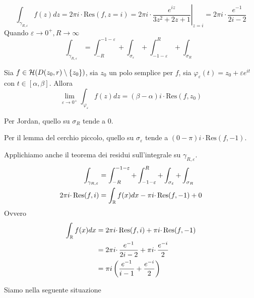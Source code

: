 \begin{equation*}
\int _{\gamma _{R,\varepsilon }} f(z)dz=2\pi i\cdot \mathrm{Res} (f,z=i)=2\pi i\cdotp \left. \frac{e^{iz}}{3z^{2} +2z+1}\right| _{z=i} =2\pi i\cdotp \frac{e^{-1}}{2i-2}
\end{equation*}
Quando $\varepsilon \rightarrow 0^{+} ,R\rightarrow \infty $
\begin{equation*}
\int _{\gamma _{R,\varepsilon }} =\int ^{-1-\varepsilon }_{-R} +\int _{\sigma _{\varepsilon }} +\int ^{R}_{-1-\varepsilon } +\int _{\sigma _{R}}
\end{equation*}
\begin{thm}
 Sia $f\in \mathcal{H} ( D( z_{0} ,r) \setminus \{z_{0}\})$, sia $z_{0}$ un polo semplice per $f$, sia $\varphi _{\varepsilon }( t) =z_{0} +\varepsilon e^{it}$ con $t\in [ \alpha ,\beta ]$. Allora
\begin{equation*}
\lim _{\varepsilon \rightarrow 0^{+}}\int _{\varphi _{\varepsilon }} f( z) dz=( \beta -\alpha ) i\cdotp \mathrm{Res}( f,z_{0})
\end{equation*}
\end{thm}
Per Jordan, quello su $\sigma _{R}$ tende a $0$.

Per il lemma del cerchio piccolo, quello su $\sigma _{\varepsilon }$ tende a $( 0-\pi ) i\cdotp \mathrm{Res}( f,-1)$.

Applichiamo anche il teorema dei residui sull'integrale su $\gamma _{R,\varepsilon }$.
\begin{equation*}
\begin{aligned}
\int _{\gamma _{R,\varepsilon }} & =\int ^{-1-\varepsilon }_{-R} +\int ^{R}_{-1-\varepsilon } +\int _{\sigma _{\varepsilon }} +\int _{\sigma _{R}}\\
2\pi i\cdotp \mathrm{Res} (f,i) & =\int _{\mathbb{R} } f( x) dx-\pi i\cdotp \mathrm{Res}( f,-1) +0
\end{aligned}
\end{equation*}
Ovvero
\begin{equation*}
\begin{aligned}
\int _{\mathbb{R} } f( x) dx & =2\pi i\cdotp \mathrm{Res} (f,i)+\pi i\cdotp \mathrm{Res}( f,-1)\\
 & =2\pi i\cdotp \frac{e^{-1}}{2i-2} +\pi i\cdotp \frac{e^{-i}}{2}\\
 & =\pi i\left(\frac{e^{-1}}{i-1} +\frac{e^{-i}}{2}\right)
\end{aligned}
\end{equation*}
\Soluzione

Siamo nella seguente situazione


